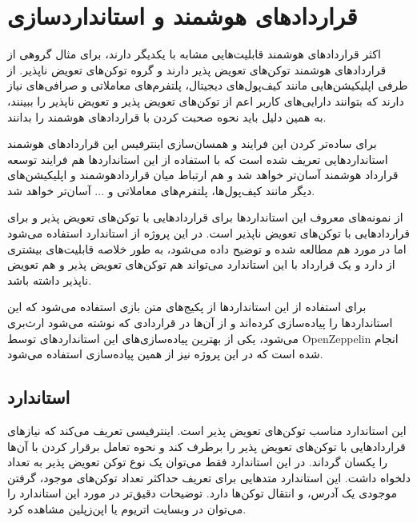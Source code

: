 \section{قرارداد‌های هوشمند و استانداردسازی}
اکثر قرارداد‌های هوشمند قابلیت‌هایی مشابه با یکدیگر دارند، برای مثال گروهی از قرارداد‌های هوشمند توکن‌های تعویض پذیر دارند و گروه توکن‌های تعویض ناپذیر. از طرفی اپلیکیشن‌هایی مانند کیف‌پول‌های دیجیتال، پلتفرم‌های معاملاتی و صرافی‌های نیاز دارند که بتوانند دارایی‌های کاربر اعم از توکن‌های تعویض پذیر و تعویض ناپذیر را ببینند، به همین دلیل باید نحوه صحبت کردن با قراردادهای هوشمند را بدانند.

برای ساده‌تر کردن این فرایند و همسان‌سازی اینترفیس  این قراردادهای هوشمند استانداردهایی تعریف شده است که با استفاده از این استانداردها هم فرایند توسعه قرارداد هوشمند آسان‌تر خواهد شد و هم ارتباط میان قراردادهوشمند و اپلیکیشن‌های دیگر مانند کیف‌پول‌ها، پلتفرم‌های معاملاتی و ... آسان‌تر خواهد شد.

از نمونه‌های معروف این استانداردها
برای قرارداد‌هایی با توکن‌های تعویض پذیر و
برای قراردادهایی با توکن‌های تعویض ناپذیر است. در این پروژه از استاندارد
استفاده می‌شود اما در مورد
هم مطالعه شده و توضیح داده می‌شود، به طور خلاصه
قابلیت‌های بیشتری از
دارد و یک قرارداد با این استاندارد می‌تواند هم توکن‌های تعویض پذیر و هم تعویض ناپذیر داشته باشد.

برای استفاده از این استاندارد‌ها از پکیج‌های متن بازی استفاده می‌شود که این استاندارد‌ها را پیاده‌سازی کرده‌اند و از آن‌ها در قراردادی که نوشته می‌شود ارث‌بری می‌شود، یکی از بهترین پیاده‌سازی‌های این استاندارد‌های توسط
\gls{OpenZeppelin}
انجام شده است که در این پروژه نیز از همین پیاده‌سازی استفاده می‌شود.

\subsection{استاندارد }
این استاندارد مناسب توکن‌های تعویض پذیر است. اینترفیسی تعریف می‌کند که نیازهای قراردادهایی با توکن‌های تعویض پذیر را برطرف کند و نحوه تعامل برقرار کردن با آن‌ها را یکسان گرداند. در این استاندارد فقط می‌توان یک نوع توکن تعویض پذیر به تعداد دلخواه داشت. این استاندارد متدهایی برای تعریف حداکثر تعداد توکن‌های موجود، گرفتن موجودی یک آدرس، و انتقال توکن‌ها دارد. توضیحات دقیق‌تر در مورد این استاندارد را می‌توان در وبسایت
اتریوم
یا اپن‌زپلین
مشاهده کرد.

